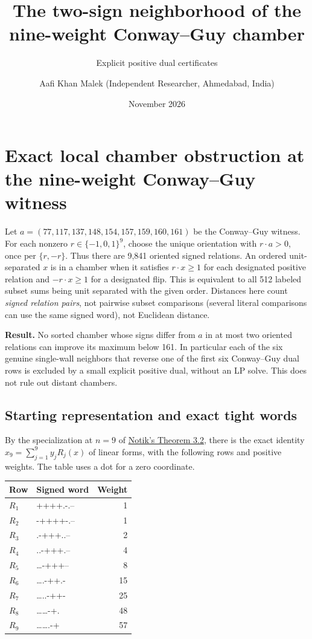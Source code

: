 \documentclass[
  11pt,
]{article}
\title{The two-sign neighborhood of the nine-weight Conway--Guy chamber}
\subtitle{Explicit positive dual certificates}
\author{Aafi Khan Malek (Independent Researcher, Ahmedabad, India)}
\date{November 2026}
\begin{document}
\maketitle

\section{Exact local chamber obstruction at the nine-weight Conway--Guy
witness}\label{exact-local-chamber-obstruction-at-the-nine-weight-conwayguy-witness}

Let \(a=(77,117,137,148,154,157,159,160,161)\) be the Conway--Guy
witness. For each nonzero \(r\in\{-1,0,1\}^9\), choose the unique
orientation with \(r\cdot a>0\), once per \(\{r,-r\}\). Thus there are
9,841 oriented signed relations. An ordered unit-separated \(x\) is in a
chamber when it satisfies \(r\cdot x\ge1\) for each designated positive
relation and \(-r\cdot x\ge1\) for a designated flip. This is equivalent
to all 512 labeled subset sums being unit separated with the given
order. Distances here count \emph{signed relation pairs}, not pairwise
subset comparisons (several literal comparisons can use the same signed
word), not Euclidean distance.

\textbf{Result.} No sorted chamber whose signs differ from \(a\) in at
most two oriented relations can improve its maximum below 161. In
particular each of the six genuine single-wall neighbors that reverse
one of the first six Conway--Guy dual rows is excluded by a small
explicit positive dual, without an LP solve. This does not rule out
distant chambers.

\subsection{Starting representation and exact tight
words}\label{starting-representation-and-exact-tight-words}

By the specialization at \(n=9\) of
\href{https://arxiv.org/abs/2611.17360}{Notik's Theorem 3.2}, there is
the exact identity \(x_9=\sum_{j=1}^9 y_jR_j(x)\) of linear forms, with
the following rows and positive weights. The table uses a dot for a zero
coordinate.

\begin{longtable}[]{@{}llr@{}}
\toprule\noalign{}
Row & Signed word & Weight \\
\midrule\noalign{}
\endhead
\bottomrule\noalign{}
\endlastfoot
\(R_1\) & ++++.-.-- & 1 \\
\(R_2\) & -++++-.-- & 1 \\
\(R_3\) & .-+++..-- & 2 \\
\(R_4\) & ..-+++.-- & 4 \\
\(R_5\) & \ldots-+++-- & 8 \\
\(R_6\) & \ldots.-++.- & 15 \\
\(R_7\) & \ldots..-++- & 25 \\
\(R_8\) & \ldots\ldots-+. & 48 \\
\(R_9\) & \ldots\ldots.-+ & 57 \\
\end{longtable}
\end{document}
